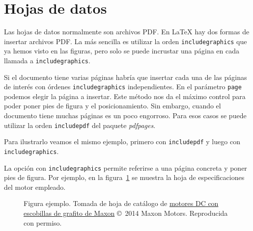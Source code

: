 \section{Hojas de datos}
\label{sec:hojas-datos}

Las hojas de datos normalmente son archivos PDF.  En \LaTeX{} hay dos formas de insertar archivos PDF.  La más sencilla es utilizar la orden \texttt{includegraphics} que ya hemos visto en las figuras, pero solo se puede incrustar una página en cada llamada a \texttt{includegraphics}. 

Si el documento tiene varias páginas habría que insertar cada una de las páginas de interés con órdenes \texttt{includegraphics} independientes.  En el parámetro \texttt{page} podemos elegir la página a insertar.  Este método nos da el máximo control para poder poner pies de figura y el posicionamiento.  Sin embargo, cuando el documento tiene muchas páginas es un poco engorroso.  Para esos casos se puede utilizar la orden \texttt{includepdf} del paquete \emph{pdfpages}.

Para ilustrarlo veamos el mismo ejemplo, primero con \texttt{includepdf} y luego con \texttt{includegraphics}.



La opción con \texttt{includegraphics} permite referirse a una página concreta y poner pies de figura.  Por ejemplo, en la figura~\ref{fig:hoja-datos} se muestra la hoja de especificaciones del motor empleado.

\begin{figure}[!ht]
\centering
{}
\caption{Figura ejemplo. Tomada de hoja de catálogo de \href{https://datasheets.globalspec.com/ds/17/MaxonPrecisionMotors/F1B48EDA-7358-46E6-964A-97E3BC5D921A}{motores DC con escobillas de grafito de Maxon} \copyright~2014 Maxon Motors. Reproducida con permiso.}
\label{fig:hoja-datos}
\end{figure}
